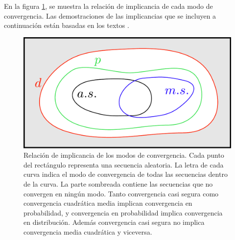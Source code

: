 \documentclass[a4paper]{report}
\begin{document}
En la figura \ref{fig:convergence_modes_relation}, se muestra la relación de implicancia de cada modo de convergencia. Las demostraciones de las implicancias que se incluyen a continuación están basadas en los textos \cite{kupferman09lectures, grimmett2001probability}.
\begin{figure}[!htb]
  \begin{minipage}[c]{0.4\textwidth}
    \includegraphics[width=\textwidth]{figuras/convergence_modes_relation.pdf}
  \end{minipage}\hfill
  \begin{minipage}[c]{0.55\textwidth}
    \caption{
       Relación de implicancia de los modos de convergencia. Cada punto del rectángulo representa una secuencia aleatoria. La letra de cada curva indica el modo de convergencia de todas las secuencias dentro de la curva. La parte sombreada contiene las secuencias que no convergen en ningún modo. Tanto convergencia casi segura como convergencia cuadrática media implican convergencia en probabilidad, y convergencia en probabilidad implica convergencia en distribución. Además convergencia casi segura no implica convergencia media cuadrática y viceversa.
    } \label{fig:convergence_modes_relation}
  \end{minipage}
\end{figure}
\end{document}
